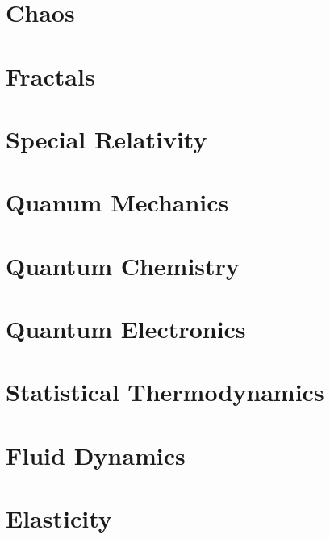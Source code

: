 \documentclass[main.tex]{subfilese}
\begin{document}
\chapter{Chaos}
\chapter{Fractals}
\chapter{Special Relativity}
\chapter{Quanum Mechanics}
\chapter{Quantum Chemistry}
\chapter{Quantum Electronics}
\chapter{Statistical Thermodynamics}
\chapter{Fluid Dynamics}
\chapter{Elasticity}

\end{document}
